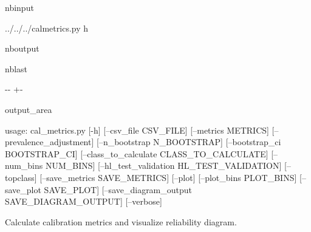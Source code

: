 \documentclass[letterpaper,10pt,english]{sphinxmanual}
\begin{document}
\begin{sphinxuseclass}{nbinput}
{
\begin{sphinxVerbatim}[commandchars=\\\{\}]
\llap{\color{nbsphinxin}[1]:\,\hspace{\fboxrule}\hspace{\fboxsep}}
 ../../../cal\PYGZus{}metrics.py \PYGZhy{}h
\end{sphinxVerbatim}
}

\end{sphinxuseclass}
\begin{sphinxuseclass}{nboutput}
\begin{sphinxuseclass}{nblast}
{

\kern-\sphinxverbatimsmallskipamount\kern-\baselineskip
\kern+\FrameHeightAdjust\kern-\fboxrule
\vspace{\nbsphinxcodecellspacing}

\begin{sphinxuseclass}{output_area}
\begin{sphinxuseclass}{}


\begin{sphinxVerbatim}[commandchars=\\\{\}]
usage: cal\_metrics.py [-h] [--csv\_file CSV\_FILE] [--metrics METRICS]
                      [--prevalence\_adjustment] [--n\_bootstrap N\_BOOTSTRAP]
                      [--bootstrap\_ci BOOTSTRAP\_CI]
                      [--class\_to\_calculate CLASS\_TO\_CALCULATE]
                      [--num\_bins NUM\_BINS]
                      [--hl\_test\_validation HL\_TEST\_VALIDATION] [--topclass]
                      [--save\_metrics SAVE\_METRICS] [--plot]
                      [--plot\_bins PLOT\_BINS] [--save\_plot SAVE\_PLOT]
                      [--save\_diagram\_output SAVE\_DIAGRAM\_OUTPUT] [--verbose]

Calculate calibration metrics and visualize reliability diagram.


\end{sphinxVerbatim}
\end{sphinxuseclass}
\end{sphinxuseclass}}
\end{sphinxuseclass}
\end{sphinxuseclass}
\end{document}
